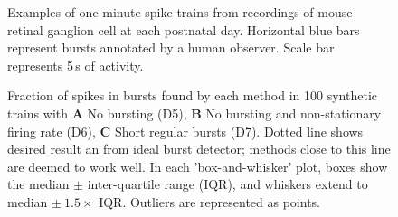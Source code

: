 \documentclass[12pt, titlepage]{article}
\begin{document}
		\begin{figure}
			\centering
			\caption{Examples of one-minute spike trains from recordings of mouse retinal ganglion cell at each postnatal day. Horizontal blue bars represent bursts annotated by a human observer. Scale bar represents 5$\,$s of activity.}
			\label{RGC_eg}
		\end{figure}
		\begin{figure}[h]
			\centering
			\caption{Fraction of spikes in bursts found by each method in 100 synthetic trains with \textbf{A} No bursting (D5), \textbf{B}  No bursting and non-stationary firing rate (D6), \textbf{C} Short regular bursts (D7). Dotted line shows desired result an from ideal burst detector; methods close to this line are deemed to work well. In each 'box-and-whisker' plot, boxes show the median $\pm$ inter-quartile range (IQR), and whiskers extend to median $\pm \ 1.5\times$ IQR. Outliers are represented as points. }
			\label{sim_results1}
		\end{figure}
\end{document}
